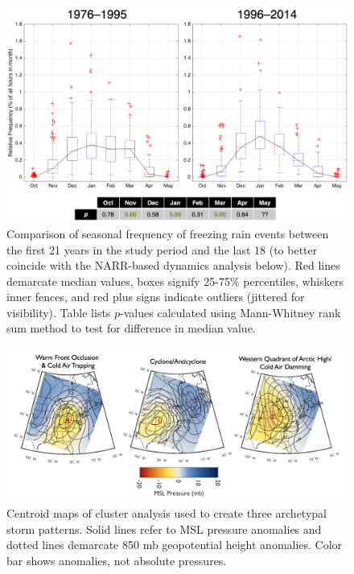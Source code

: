 \documentclass[twocol]{ametsoc}
\begin{document}
\begin{figure}
\centering
\includegraphics[width=1\textwidth]{Seasonal_new.png}
\caption{\label{fig:seasonal} Comparison of seasonal frequency of freezing rain events between the first 21 years in the study period and the last 18 (to better coincide with the NARR-based dynamics analysis below). Red lines demarcate median values, boxes signify 25-75\% percentiles, whiskers inner fences, and red plus signs indicate outliers (jittered for visibility). Table lists $p$-values calculated using Mann-Whitney rank sum method to test for difference in median value.}
\end{figure}

\begin{figure}
\centering
\includegraphics[width=1\textwidth]{Cluster_Centroids.png}
\caption{\label{fig:centroids} Centroid maps of cluster analysis  used to create three archetypal storm patterns. Solid lines refer to MSL pressure anomalies and dotted lines demarcate 850 mb geopotential height anomalies. Color bar shows anomalies, not absolute pressures.}
\end{figure}
\end{document}
